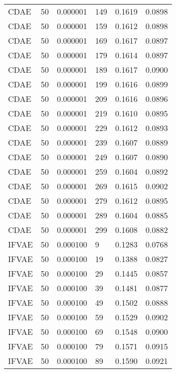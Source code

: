 \begin{tabular}{llrlrr}
    CDAE &   50 &  0.000001 &   149 &  0.1619 &       0.0898 \\
    CDAE &   50 &  0.000001 &   159 &  0.1612 &       0.0898 \\
    CDAE &   50 &  0.000001 &   169 &  0.1617 &       0.0897 \\
    CDAE &   50 &  0.000001 &   179 &  0.1614 &       0.0897 \\
    CDAE &   50 &  0.000001 &   189 &  0.1617 &       0.0900 \\
    CDAE &   50 &  0.000001 &   199 &  0.1616 &       0.0899 \\
    CDAE &   50 &  0.000001 &   209 &  0.1616 &       0.0896 \\
    CDAE &   50 &  0.000001 &   219 &  0.1610 &       0.0895 \\
    CDAE &   50 &  0.000001 &   229 &  0.1612 &       0.0893 \\
    CDAE &   50 &  0.000001 &   239 &  0.1607 &       0.0889 \\
    CDAE &   50 &  0.000001 &   249 &  0.1607 &       0.0890 \\
    CDAE &   50 &  0.000001 &   259 &  0.1604 &       0.0892 \\
    CDAE &   50 &  0.000001 &   269 &  0.1615 &       0.0902 \\
    CDAE &   50 &  0.000001 &   279 &  0.1612 &       0.0895 \\
    CDAE &   50 &  0.000001 &   289 &  0.1604 &       0.0885 \\
    CDAE &   50 &  0.000001 &   299 &  0.1608 &       0.0882 \\
   IFVAE &   50 &  0.000100 &     9 &  0.1283 &       0.0768 \\
   IFVAE &   50 &  0.000100 &    19 &  0.1388 &       0.0827 \\
   IFVAE &   50 &  0.000100 &    29 &  0.1445 &       0.0857 \\
   IFVAE &   50 &  0.000100 &    39 &  0.1481 &       0.0877 \\
   IFVAE &   50 &  0.000100 &    49 &  0.1502 &       0.0888 \\
   IFVAE &   50 &  0.000100 &    59 &  0.1529 &       0.0902 \\
   IFVAE &   50 &  0.000100 &    69 &  0.1548 &       0.0900 \\
   IFVAE &   50 &  0.000100 &    79 &  0.1571 &       0.0915 \\
   IFVAE &   50 &  0.000100 &    89 &  0.1590 &       0.0921 \\

\end{tabular}
